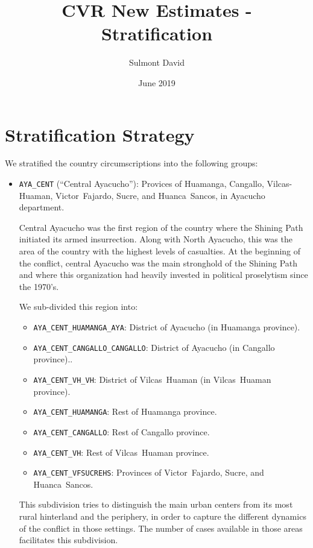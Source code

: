 \documentclass{article}
\title{CVR New Estimates - Stratification}
\author{Sulmont David}
\date{June 2019}
\begin{document}
\maketitle

\section{Stratification Strategy}

We stratified the country circumscriptions into the following groups: 

\begin{itemize}
  \item \texttt{AYA\_CENT} (``Central Ayacucho''): Provices of Huamanga, Cangallo, Vilcas-Huaman, Victor~Fajardo, Sucre, and Huanca~Sancos, in Ayacucho department. 

    Central Ayacucho was the first region of the country where the Shining Path initiated its armed insurrection. Along with North Ayacucho, this was the area of the country with the highest levels of casualties. At the beginning of the conflict, central Ayacucho was the main stronghold of the Shining Path and where this organization had heavily invested in political proselytism since the 1970's.

    We sub-divided this region into: 
    \begin{itemize} 
      \item \texttt{AYA\_CENT\_HUAMANGA\_AYA}:       District of Ayacucho (in Huamanga province).
      \item \texttt{AYA\_CENT\_CANGALLO\_CANGALLO}:  District of Ayacucho (in Cangallo province)..
      \item \texttt{AYA\_CENT\_VH\_VH}:              District of Vilcas~Huaman (in Vilcas~Huaman province).
      \item \texttt{AYA\_CENT\_HUAMANGA}: Rest of Huamanga province.
      \item \texttt{AYA\_CENT\_CANGALLO}: Rest of Cangallo province.
      \item \texttt{AYA\_CENT\_VH}: Rest of Vilcas~Huaman province.
      \item \texttt{AYA\_CENT\_VFSUCREHS}: Provinces of Victor~Fajardo, Sucre, and Huanca~Sancos.
    \end{itemize}

    This subdivision tries to distinguish the main urban centers from its most rural hinterland and the periphery, in order to capture the different dynamics of the conflict in those settings. The number of cases available in those areas facilitates this subdivision.  



\end{itemize}
\end{document}
